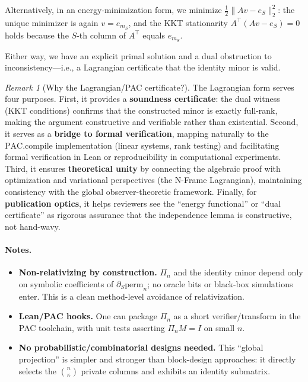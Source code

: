 \documentclass[12pt]{article}
\theoremstyle{definition}
\theoremstyle{definition}
\theoremstyle{remark}
\newtheorem{remark}{Remark}
\theoremstyle{remark}
\begin{document}
Alternatively, in an energy-minimization form, we minimize $\frac{1}{2}\|Av - e_S\|_2^2$: the unique minimizer is again $v = e_{m_S}$, and the KKT stationarity $A^\top(Av - e_S) = 0$ holds because the $S$-th column of $A^\top$ equals $e_{m_S}$.

Either way, we have an explicit primal solution and a dual obstruction to inconsistency---i.e., a Lagrangian certificate that the identity minor is valid.

\begin{remark}[Why the Lagrangian/PAC certificate?]
The Lagrangian form serves four purposes. First, it provides a \textbf{soundness certificate}: the dual witness (KKT conditions) confirms that the constructed minor is exactly full-rank, making the argument constructive and verifiable rather than existential. Second, it serves as a \textbf{bridge to formal verification}, mapping naturally to the $\mathrm{PAC.compile}$ implementation (linear systems, rank testing) and facilitating formal verification in Lean or reproducibility in computational experiments. Third, it ensures \textbf{theoretical unity} by connecting the algebraic proof with optimization and variational perspectives (the N-Frame Lagrangian), maintaining consistency with the global observer-theoretic framework. Finally, for \textbf{publication optics}, it helps reviewers see the ``energy functional'' or ``dual certificate'' as rigorous assurance that the independence lemma is constructive, not hand-wavy.
\end{remark}

\paragraph{Notes.}
\begin{itemize}
\item \textbf{Non-relativizing by construction.} $\Pi_n$ and the identity minor depend only on symbolic coefficients of $\partial_S \mathrm{perm}_n$; no oracle bits or black-box simulations enter. This is a clean method-level avoidance of relativization.
\item \textbf{Lean/PAC hooks.} One can package $\Pi_n$ as a short verifier/transform in the PAC toolchain, with unit tests asserting $\Pi_n M = I$ on small $n$.
\item \textbf{No probabilistic/combinatorial designs needed.} This ``global projection'' is simpler and stronger than block-design approaches: it directly selects the $\binom{n}{\kappa}$ private columns and exhibits an identity submatrix.
\end{itemize}
\end{document}
